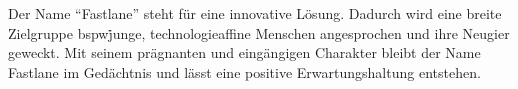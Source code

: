 Der Name \enquote{Fastlane} steht für eine innovative Lösung.
Dadurch wird eine breite Zielgruppe bspw\. junge, technologieaffine Menschen angesprochen und ihre Neugier geweckt.
Mit seinem prägnanten und eingängigen Charakter bleibt der Name Fastlane im Gedächtnis und lässt eine positive Erwartungshaltung entstehen.